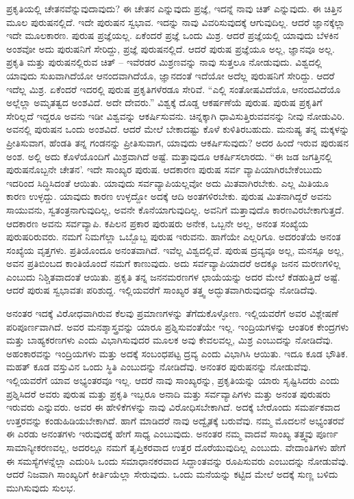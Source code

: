 ಪ್ರಕೃತಿಯಲ್ಲಿ ಚೇತನವೆನ್ನುವುದಾವುದು? ಈ ಚೇತನ ಎನ್ನುವುದು ಪ್ರಜ್ಞೆ, ಇದನ್ನೆ ನಾವು ಚಿತ್ ಎನ್ನುವುದು. ಈ ಚಿತ್ತಿನ ಮೂಲ ಪುರುಷನಲ್ಲಿದೆ. ಇದೇ ಪುರುಷನ ಸ್ವಭಾವ. ಇದನ್ನು ನಾವು ವಿವರಿಸುವುದಕ್ಕೆ ಆಗುವುದಿಲ್ಲ. ಆದರೆ ಜ್ಞಾನಕ್ಕೆಲ್ಲಾ ಇದೇ ಮೂಲಕಾರಣ. ಪುರುಷ ಪ್ರಜ್ಞೆಯಲ್ಲ. ಏಕೆಂದರೆ ಪ್ರಜ್ಞೆ ಒಂದು ಮಿಶ್ರ. ಆದರೆ ಪ್ರಜ್ಞೆಯಲ್ಲಿ ಯಾವುದು ಬೆಳಕಿನ ಅಂಶವೋ ಅದು ಪುರುಷನಿಗೆ ಸೇರಿದ್ದು, ಪ್ರಜ್ಞೆ ಪುರುಷನಲ್ಲಿದೆ. ಆದರೆ ಪುರುಷ ಪ್ರಜ್ಞೆಯೂ ಅಲ್ಲ, ಜ್ಞಾನವೂ ಅಲ್ಲ. ಪ್ರಕೃತಿ ಮತ್ತು ಪುರುಷನಲ್ಲಿರುವ ಚಿತ್ – ಇವೆರಡರ ಮಿಶ್ರಣವನ್ನು ನಾವು ಸುತ್ತಲೂ ನೋಡುವುದು. ವಿಶ್ವದಲ್ಲಿ ಯಾವುದು ಸುಖವಾಗಿದೆಯೋ ಆನಂದವಾಗಿದೆಯೊ, ಜ್ಞಾನದಂತೆ ಇದೆಯೋ ಅದೆಲ್ಲ ಪುರುಷನಿಗೆ ಸೇರಿದ್ದು. ಆದರೆ ಇದೆಲ್ಲ ಮಿಶ್ರ. ಏಕೆಂದರೆ ಇದರಲ್ಲಿ ಪುರುಷ ಪ್ರಕೃತಿಗಳೆರಡೂ ಸೇರಿವೆ. “ಎಲ್ಲಿ ಸಂತೋಷವಿದೆಯೊ, ಆನಂದವಿದೆಯೊ ಅಲ್ಲೆಲ್ಲಾ ಅಮೃತತ್ವದ ಅಂಶವಿದೆ. ಅದೇ ದೇವರು.'' ವಿಶ್ವಕ್ಕೆ ದೊಡ್ಡ ಆಕರ್ಷಣೆಯೆ ಪುರುಷ. ಪುರುಷ ಪ್ರಕೃತಿಗೆ ಸೇರಿಲ್ಲದೆ ಇದ್ದರೂ ಅವನು ಇಡೀ ವಿಶ್ವವನ್ನು ಆಕರ್ಷಿಸುವನು. ಚಿನ್ನಕ್ಕಾಗಿ ಧಾವಿಸುತ್ತಿರುವವನನ್ನು ನೀವು ನೋಡುವಿರಿ. ಅವನಲ್ಲಿ ಪುರುಷನ ಒಂದು ಅಂಶವಿದೆ. ಆದರೆ ಮೇಲೆ ಬೇಕಾದಷ್ಟು ಕೊಳೆ ಕುಳಿತಿರಬಹುದು. ಮನುಷ್ಯ ತನ್ನ ಮಕ್ಕಳನ್ನು ಪ್ರೀತಿಸುವಾಗ, ಹೆಂಡತಿ ತನ್ನ ಗಂಡನನ್ನು ಪ್ರೀತಿಸುವಾಗ, ಯಾವುದು ಆಕರ್ಷಿಸುವುದು? ಅದರ ಹಿಂದೆ ಇರುವ ಪುರುಷನ ಅಂಶ. ಅಲ್ಲಿ ಅದು ಕೊಳೆಯೊಂದಿಗೆ ಮಿಶ್ರವಾಗಿದೆ ಅಷ್ಟೆ. ಮತ್ತಾವುದೂ ಆಕರ್ಷಿಸಲಾರದು. “ಈ ಜಡ ಜಗತ್ತಿನಲ್ಲಿ ಪುರುಷನೊಬ್ಬನೇ ಚೇತನ'. ಇದೇ ಸಾಂಖ್ಯರ ಪುರುಷ. ಆದಕಾರಣ ಪುರುಷ ಸರ್ವ ವ್ಯಾಪಿಯಾಗಿರಬೇಕೆಂಬುದು ಇದರಿಂದ ಸಿದ್ಧಿಸಿದಂತೆ ಆಯಿತು. ಯಾವುದು ಸರ್ವವ್ಯಾಪಿಯಲ್ಲವೋ ಅದು ಮಿತವಾಗಿರಬೇಕು. ಎಲ್ಲ ಮಿತಿಯೂ ಕಾರಣ ಉಳ್ಳದ್ದು. ಯಾವುದು ಕಾರಣ ಉಳ್ಳದ್ದೋ ಅದಕ್ಕೆ ಆದಿ ಅಂತಗಳಿರಬೇಕು. ಪುರುಷ ಮಿತನಾಗಿದ್ದರೆ ಅವನು ಸಾಯುವನು, ಸ್ವತಂತ್ರನಾಗುವುದಿಲ್ಲ, ಅವನೇ ಕೊನೆಯಾಗುವುದಿಲ್ಲ. ಅವನಿಗೆ ಮತ್ತಾವುದೊ ಕಾರಣವಿರಬೇಕಾಗುತ್ತದೆ. ಆದಕಾರಣ ಅವನು ಸರ್ವವ್ಯಾಪಿ. ಕಪಿಲನ ಪ್ರಕಾರ ಪುರುಷರು ಅನೇಕ, ಒಬ್ಬನೇ ಅಲ್ಲ, ಅನಂತ ಸಂಖ್ಯೆಯ ಪುರುಷರಿರುವರು. ನಮಗೆ ನಿಮಗೆಲ್ಲಾ ಒಬ್ಬೊಬ್ಬ ಪುರುಷ ಇರುವನು. ಹಾಗೆಯೇ ಎಲ್ಲರಿಗೂ. ಅದರಂತೆಯೆ ಅನಂತ ಸಂಖ್ಯೆಯ ವೃತ್ತಗಳು. ಪ್ರತಿಯೊಂದೂ ಅನಂತವಾಗಿದೆ. ಇವೆಲ್ಲ ವಿಶ್ವದಲ್ಲಿವೆ. ಪುರುಷ ದ್ರವ್ಯವೂ ಅಲ್ಲ, ಮನಸ್ಸೂ ಅಲ್ಲ, ಅವನ ಪ್ರತಿಬಿಂಬದ ಕಾಂತಿಯೊಂದೆ ನಮಗೆ ಕಾಣುವುದು. ಅದು ಸರ್ವವ್ಯಾಪಿಯಾದರೆ ಅದಕ್ಕೂ ಜನನ ಮರಣಗಳಿಲ್ಲ ಎಂಬುದು ನಿಶ್ಚಿತವಾದಂತೆ ಆಯಿತು. ಪ್ರಕೃತಿ ತನ್ನ ಜನನಮರಣಗಳ ಛಾಯೆಯನ್ನು ಅದರ ಮೇಲೆ ಕೆಡಹುತ್ತಿದೆ ಅಷ್ಟೆ. ಆದರೆ ಪುರುಷ ಸ್ವಭಾವತಃ ಪರಿಶುದ್ದ. ಇಲ್ಲಿಯವರೆಗೆ ಸಾಂಖ್ಯರ ತತ್ತ್ವ ಅದ್ಭುತವಾಗಿರುವುದನ್ನು ನೋಡಿದೆವು.

ಅನಂತರ ಇದಕ್ಕೆ ವಿರೋಧವಾಗಿರುವ ಕೆಲವು ಪ್ರಮಾಣಗಳನ್ನು ತೆಗೆದುಕೊಳ್ಳೋಣ. ಇಲ್ಲಿಯವರೆಗೆ ಅವರ ವಿಶ್ಲೇಷಣೆ ಪರಿಪೂರ್ಣವಾಗಿದೆ. ಅವರ ಮನಶ್ಶಾಸ್ತ್ರವನ್ನು ಯಾರೂ ಪ್ರಶ್ನಿಸುವಂತೆಯೇ ಇಲ್ಲ. ಇಂದ್ರಿಯಗಳನ್ನು ಆಂತರಿಕ ಕೇಂದ್ರಗಳು ಮತ್ತು ಬಾಹ್ಯಕರಣಗಳು ಎಂದು ವಿಭಾಗಿಸುವುದರ ಮೂಲಕ ಅವು ಕೇವಲವಲ್ಲ, ಮಿಶ್ರ ಎಂಬುದನ್ನು ನೋಡಿದೆವು. ಅಹಂಕಾರವನ್ನು ಇಂದ್ರಿಯಗಳು ಮತ್ತು ಅದಕ್ಕೆ ಸಂಬಂಧಪಟ್ಟ ದ್ರವ್ಯ ಎಂದು ವಿಭಾಗಿಸಿ ಆಯಿತು. ಇದೂ ಕೂಡ ಭೌತಿಕ. ಮಹತ್ ಕೂಡ ವಸ್ತುವಿನ ಒಂದು ಸ್ಥಿತಿ ಎಂಬುದನ್ನು ನೋಡಿದೆವು. ಅನಂತರ ಪುರುಷನನ್ನು ನೋಡುವೆವು. ಇಲ್ಲಿಯವರೆಗೆ ಯಾವ ಅಭ್ಯಂತರವೂ ಇಲ್ಲ. ಆದರೆ ನಾವು ಸಾಂಖ್ಯರನ್ನು, ಪ್ರಕೃತಿಯನ್ನು ಯಾರು ಸೃಷ್ಟಿಸಿದರು ಎಂದು ಪ್ರಶ್ನಿಸಿದರೆ ಅವರು ಪುರುಷ ಮತ್ತು ಪ್ರಕೃತಿ ಇಬ್ಬರೂ ಅನಾದಿ ಮತ್ತು ಸರ್ವವ್ಯಾಪಿಗಳು ಮತ್ತು ಅನಂತ ಪುರುಷರು ಇರುವರು ಎನ್ನುವರು. ಅವರ ಈ ಹೇಳಿಕೆಗಳನ್ನು ನಾವು ವಿರೋಧಿಸಬೇಕಾಗಿದೆ. ಅದಕ್ಕೆ ಬೇರೊಂದು ಸಮರ್ಪಕವಾದ ಉತ್ತರವನ್ನು ಕಂಡುಹಿಡಿಯಬೇಕಾಗಿದೆ. ಹಾಗೆ ಮಾಡಿದರೆ ನಾವು ಅದ್ವೈತಕ್ಕೆ ಬರುವೆವು. ನಮ್ಮ ಮೊದಲನೆ ಅಭ್ಯಂತರವೆ ಈ ಎರಡು ಅನಂತಗಳು ಇರುವುದಕ್ಕೆ ಹೇಗೆ ಸಾಧ್ಯ ಎಂಬುವುದು. ಅನಂತರ ನಮ್ಮ ವಾದವೆ ಸಾಂಖ್ಯ ತತ್ತ್ವವು ಪೂರ್ಣ ಸಾಮಾನ್ಯೀಕರಣವಲ್ಲ, ಅದರಲ್ಲೂ ನಮಗೆ ತೃಪ್ತಿಕರವಾದ ಉತ್ತರ ದೊರೆಯುವುದಿಲ್ಲ ಎಂಬುದು. ವೇದಾಂತಿಗಳು ಹೇಗೆ ಈ ಸಮಸ್ಯೆಗಳನ್ನೆಲ್ಲಾ ಎದುರಿಸಿ ಒಂದು ಸಮಾಧಾನಕರವಾದ ಸಿದ್ದಾಂತವನ್ನು ರೂಪಿಸುವರು ಎಂಬುದನ್ನು ನೋಡುವೆವು. ಆದರೆ ನಿಜವಾಗಿ ಸಾಂಖ್ಯರಿಗೆ ಕೀರ್ತಿಯೆಲ್ಲಾ ಸೇರುವುದು. ಒಂದು ಮನೆಯನ್ನು ಕಟ್ಟಿದ ಮೇಲೆ ಅದಕ್ಕೆ ಸುಣ್ಣ ಬಳಿದು ಮುಗಿಸುವುದು ಸುಲಭ.

